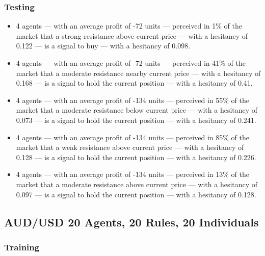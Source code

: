 \subsubsection{Testing}

{\small
  \begin{itemize}
  \item 4 agents — with an average profit of -72 units — perceived in 1\% of the
    market that a strong resistance above current price — with a hesitancy of
    0.122 — is a signal to buy — with a hesitancy of 0.098.
  \item 4 agents — with an average profit of -72 units — perceived in 41\% of
    the market that a moderate resistance nearby current price — with a
    hesitancy of 0.168 — is a signal to hold the current position — with a
    hesitancy of 0.41.
  \item 4 agents — with an average profit of -134 units — perceived in 55\% of
    the market that a moderate resistance below current price — with a hesitancy
    of 0.073 — is a signal to hold the current position — with a hesitancy of
    0.241.
  \item 4 agents — with an average profit of -134 units — perceived in 85\% of
    the market that a weak resistance above current price — with a hesitancy of
    0.128 — is a signal to hold the current position — with a hesitancy of
    0.226.
  \item 4 agents — with an average profit of -134 units — perceived in 13\% of
    the market that a moderate resistance above current price — with a hesitancy
    of 0.097 — is a signal to hold the current position — with a hesitancy of
    0.128.
  \end{itemize}
}

\subsection{AUD/USD 20 Agents, 20 Rules, 20 Individuals}


\subsubsection{Training}

